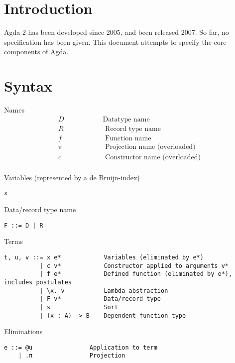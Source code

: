 \documentclass[acmlarge]{acmart}\settopmatter{}
\renewcommand{\|}{|}
\begin{document}
\section{Introduction}

Agda 2 has been developed since 2005, and been released 2007.  So far,
no specification has been given.  This document attempts to specify
the core components of Agda.


\section{Syntax}
\label{sec:syntax}

\newcommand{\bang}{\,!\,}
\newcommand{\twobang}{\,!!\,}


Names
\[
\begin{array}{ll}
D   & \hspace{2cm}\text{Datatype name} \\
  R & \hspace{2cm}\text{   Record type name} \\
  f & \hspace{2cm}\text{   Function name} \\
\pi & \hspace{2cm}\text{  Projection name  (overloaded)} \\
  c & \hspace{2cm}\text{   Constructor name (overloaded)} \\
\end{array}
\]

Variables (represented by a de Bruijn-index)
\begin{verbatim}
x
\end{verbatim}

Data/record type name
\begin{verbatim}
F ::= D | R
\end{verbatim}

Terms
\begin{verbatim}
t, u, v ::= x e*            Variables (eliminated by e*)
          | c v*            Constructor applied to arguments v*
          | f e*            Defined function (eliminated by e*), includes postulates
          | \x. v           Lambda abstraction
          | F v*            Data/record type
          | s               Sort
          | (x : A) -> B    Dependent function type
\end{verbatim}

Eliminations
\begin{verbatim}
e ::= @u                Application to term
    | .π                Projection
\end{verbatim}
\end{document}
